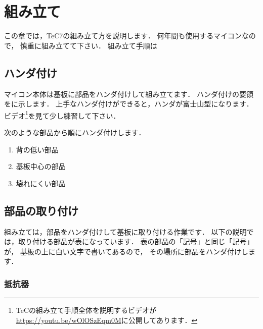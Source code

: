 \renewcommand{\myincludegraphics}[2]{\texttt{[image: chap3/\#1]}}

\chapter{組み立て\label{kumitate}}

この章では，TeC7の組み立て方を説明します．
何年間も使用するマイコンなので，
慎重に組み立てて下さい．
組み立て手順は

\section{ハンダ付け}

マイコン本体は基板に部品をハンダ付けして組み立てます．
ハンダ付けの要領をに示します．
上手なハンダ付けができると，ハンダが富士山型になります．
ビデオ\footnote{TeCの組み立て手順全体を説明するビデオが
\url{https://youtu.be/wOlOSzEqm0M}に公開してあります．
}を見て少し練習して下さい．


次のような部品から順にハンダ付けします．

\begin{enumerate}
\item 背の低い部品
\item 基板中心の部品
\item 壊れにくい部品
\end{enumerate}

\section{部品の取り付け}
組み立ては，部品をハンダ付けして基板に取り付ける作業です．
以下の説明では，取り付ける部品が表になっています．
表の部品の「記号」と同じ「記号」が，
基板の上に白い文字で書いてあるので，
その場所に部品をハンダ付けします．

%

\subsection{抵抗器}

